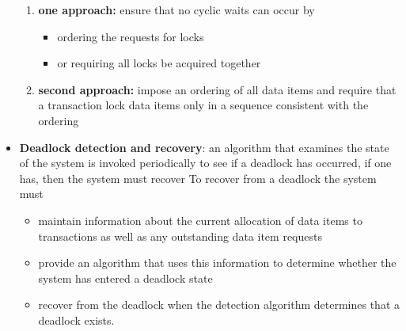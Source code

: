 \documentclass{report}
\begin{document}
\begin{itemize}
\begin{enumerate}
                \item \textbf{one approach:} ensure that no cyclic waits can occur by
                    \begin{itemize}
                        \item ordering the requests for locks
                        \item or requiring all locks be acquired together 
                    \end{itemize}
                \item \textbf{second approach:} impose an ordering of all data items and require that a transaction lock data items only in a sequence consistent with the ordering
            \end{enumerate}
        \item \textbf{Deadlock detection and recovery}: an algorithm that examines the state of the system is invoked periodically to see if a deadlock has occurred, if one has, then the system must recover
            \bigbreak \noindent 
            To recover from a deadlock the system must
            \begin{itemize}
                \item maintain information about the current allocation of data items to transactions as well as any outstanding data item requests
                \item provide an algorithm that uses this information to determine whether the system has entered a deadlock state
                \item recover from the deadlock when the detection algorithm determines that a deadlock exists.
            \end{itemize}
    \end{itemize}

    \pagebreak 
\end{document}
